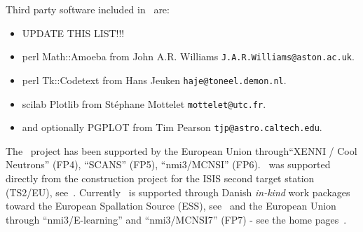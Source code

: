 Third party software included in \MCS\ are:
\begin{itemize}
\item UPDATE THIS LIST!!!
\item perl Math::Amoeba from John A.R. Williams \verb+J.A.R.Williams@aston.ac.uk+.
\item perl Tk::Codetext from Hans Jeuken \verb+haje@toneel.demon.nl+.
\item scilab Plotlib from St\'ephane Mottelet \verb+mottelet@utc.fr+.
\item and optionally PGPLOT from Tim Pearson \verb+tjp@astro.caltech.edu+.
\end{itemize}

The \MCS\ project has been supported by the European Union
through``XENNI / Cool Neutrons'' (FP4), ``SCANS'' (FP5),
``nmi3/MCNSI'' (FP6). \MCS\ was supported directly from the construction project for the ISIS second
target station (TS2/EU), see~\cite{ts2_webpage}. Currently \MCS\ is 
supported through Danish \emph{in-kind} work packages toward the
European Spallation Source (ESS), see~\cite{ess_webpage} and the
European Union through ``nmi3/E-learning'' and ``nmi3/MCNSI7'' (FP7) - see
the home pages~\cite{nmi3_webpage,mcnsi_webpage}.

